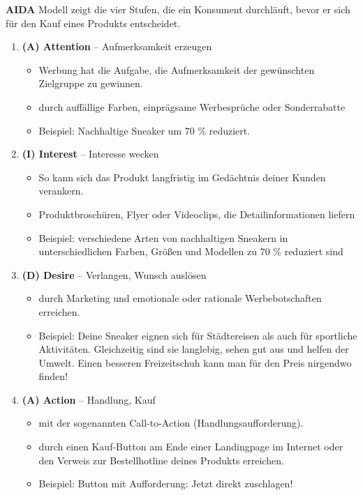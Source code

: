 \textbf{AIDA} Modell zeigt die vier Stufen, die ein Konsument
durchläuft, bevor er sich für den Kauf eines Produkts entscheidet.

\begin{enumerate}
\item
  \textbf{(A) Attention} -- Aufmerksamkeit erzeugen

  \begin{itemize}
  \item
    Werbung hat die Aufgabe, die Aufmerksamkeit der gewünschten
    Zielgruppe zu gewinnen.
  \item
    durch auffällige Farben, einprägsame Werbesprüche oder Sonderrabatte
  \item
    Beispiel: Nachhaltige Sneaker um 70 \% reduziert.
  \end{itemize}
\item
  \textbf{(I) Interest} -- Interesse wecken

  \begin{itemize}
  \item
    So kann sich das Produkt langfristig im Gedächtnis deiner Kunden
    verankern.
  \item
    Produktbroschüren, Flyer oder Videoclips, die Detailinformationen
    liefern
  \item
    Beispiel: verschiedene Arten von nachhaltigen Sneakern in
    unterschiedlichen Farben, Größen und Modellen zu 70 \% reduziert
    sind
  \end{itemize}
\item
  \textbf{(D) Desire} -- Verlangen, Wunsch auslösen

  \begin{itemize}
  \item
    durch Marketing und emotionale oder rationale Werbebotschaften
    erreichen.
  \item
    Beispiel: Deine Sneaker eignen sich für Städtereisen als auch für
    sportliche Aktivitäten. Gleichzeitig sind sie langlebig, sehen gut
    aus und helfen der Umwelt. Einen besseren Freizeitschuh kann man für
    den Preis nirgendwo finden!
  \end{itemize}
\item
  \textbf{(A) Action} -- Handlung, Kauf

  \begin{itemize}
  \item
    mit der sogenannten Call-to-Action (Handlungsaufforderung).
  \item
    durch einen Kauf-Button am Ende einer Landingpage im Internet oder
    den Verweis zur Bestellhotline deines Produkts erreichen.
  \item
    Beispiel: Button mit Aufforderung: Jetzt direkt zuschlagen!
  \end{itemize}
\end{enumerate}

